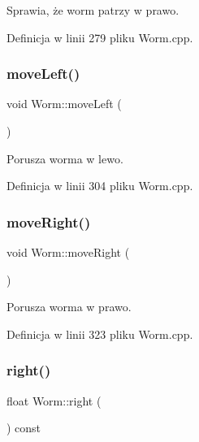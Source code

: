 Sprawia, że worm patrzy w prawo. 



Definicja w linii 279 pliku Worm.\+cpp.

\mbox{\label{class_worm_a93d02457a10bbbfc1d2028168419ecb8}} 
\subsubsection{\texorpdfstring{move\+Left()}{moveLeft()}}
{\footnotesize\ttfamily void Worm\+::move\+Left (\begin{DoxyParamCaption}{ }\end{DoxyParamCaption})}



Porusza worma w lewo. 



Definicja w linii 304 pliku Worm.\+cpp.

\mbox{\label{class_worm_a6d4b33910c18b0e266e310d9b5512d75}} 
\subsubsection{\texorpdfstring{move\+Right()}{moveRight()}}
{\footnotesize\ttfamily void Worm\+::move\+Right (\begin{DoxyParamCaption}{ }\end{DoxyParamCaption})}



Porusza worma w prawo. 



Definicja w linii 323 pliku Worm.\+cpp.

\mbox{\label{class_worm_a52905b36980b4aa37fe1b004df9edc0e}} 
\subsubsection{\texorpdfstring{right()}{right()}}
{\footnotesize\ttfamily float Worm\+::right (\begin{DoxyParamCaption}{ }\end{DoxyParamCaption}) const}



